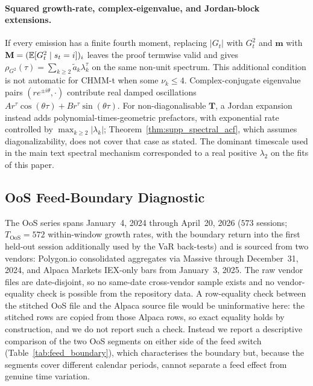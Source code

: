 \paragraph{Squared growth-rate, complex-eigenvalue, and Jordan-block extensions.}
If every emission has a finite fourth moment, replacing $|G_t|$ with $G_t^2$ and $\mathbf m$ with $\mathbf M = (\mathbb{E}[G_t^2 \mid s_t = i])_i$ leaves the proof termwise valid and gives $\rho_{G^2}(\tau) = \sum_{k \ge 2} \tilde a_k \lambda_k^\tau$ on the same non-unit spectrum. This additional condition is not automatic for CHMM-t when some $\nu_k \le 4$. Complex-conjugate eigenvalue pairs $(re^{\pm i\theta}, \cdot)$ contribute real damped oscillations $A r^\tau \cos(\theta\tau) + B r^\tau \sin(\theta\tau)$. For non-diagonalisable $\mathbf T$, a Jordan expansion instead adds polynomial-times-geometric prefactors, with exponential rate controlled by $\max_{k \ge 2} |\lambda_k|$; Theorem~\ref{thm:supp_spectral_acf}, which assumes diagonalizability, does not cover that case as stated. The dominant timescale used in the main text spectral mechanism corresponded to a real positive $\lambda_2$ on the fits of this paper.

\subsection{OoS Feed-Boundary Diagnostic}
\label{sec:feed_boundary}

The OoS series spans January~4, 2024 through April~20, 2026 ($573$ sessions; $T_{\text{OoS}} = 572$ within-window growth rates, with the boundary return into the first held-out session additionally used by the VaR back-tests) and is sourced from two vendors: Polygon.io consolidated aggregates via Massive through December~31, 2024, and Alpaca Markets IEX-only bars from January~3, 2025. The raw vendor files are date-disjoint, so no same-date cross-vendor sample exists and no vendor-equality check is possible from the repository data. A row-equality check between the stitched OoS file and the Alpaca source file would be uninformative here: the stitched rows are copied from those Alpaca rows, so exact equality holds by construction, and we do not report such a check. Instead we report a descriptive comparison of the two OoS segments on either side of the feed switch (Table~\ref{tab:feed_boundary}), which characterises the boundary but, because the segments cover different calendar periods, cannot separate a feed effect from genuine time variation.

